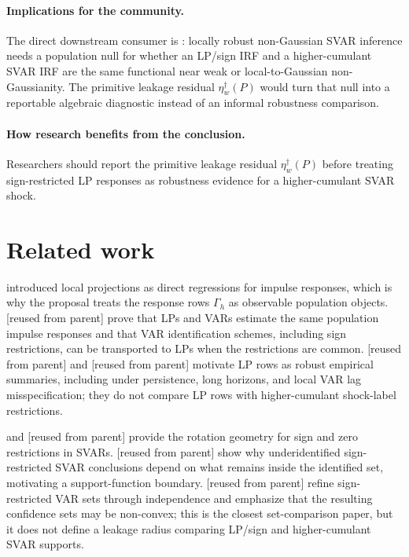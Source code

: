 \documentclass[11pt]{article}
\theoremstyle{definition}
\theoremstyle{plain}
\theoremstyle{remark}
\begin{document}
\paragraph{Implications for the community.}
The direct downstream consumer is \citet{HoeschLeeMesters2024}: locally robust non-Gaussian SVAR inference needs a population null for whether an LP/sign IRF and a higher-cumulant SVAR IRF are the same functional near weak or local-to-Gaussian non-Gaussianity.  The primitive leakage residual \(\eta_w^\dagger(P)\) would turn that null into a reportable algebraic diagnostic instead of an informal robustness comparison.

\paragraph{How research benefits from the conclusion.}
Researchers should report the primitive leakage residual \(\eta_w^\dagger(P)\) before treating sign-restricted LP responses as robustness evidence for a higher-cumulant SVAR shock.

\section{Related work}
\citet{Jorda2005} introduced local projections as direct regressions for impulse responses, which is why the proposal treats the response rows \(\Gamma_h\) as observable population objects.  \citet{PlagborgMollerWolf2021} [reused from parent] prove that LPs and VARs estimate the same population impulse responses and that VAR identification schemes, including sign restrictions, can be transported to LPs when the restrictions are common.  \citet{MontielOleaPlagborgMoller2021} [reused from parent] and \citet{MontielOleaPlagborgMollerQianWolf2024} [reused from parent] motivate LP rows as robust empirical summaries, including under persistence, long horizons, and local VAR lag misspecification; they do not compare LP rows with higher-cumulant shock-label restrictions.

\citet{RubioRamirezWaggonerZha2010} and \citet{AriasRubioRamirezWaggoner2018} [reused from parent] provide the rotation geometry for sign and zero restrictions in SVARs.  \citet{BaumeisterHamilton2015} [reused from parent] show why underidentified sign-restricted SVAR conclusions depend on what remains inside the identified set, motivating a support-function boundary.  \citet{DrautzburgWright2023} [reused from parent] refine sign-restricted VAR sets through independence and emphasize that the resulting confidence sets may be non-convex; this is the closest set-comparison paper, but it does not define a leakage radius comparing LP/sign and higher-cumulant SVAR supports.
\end{document}
